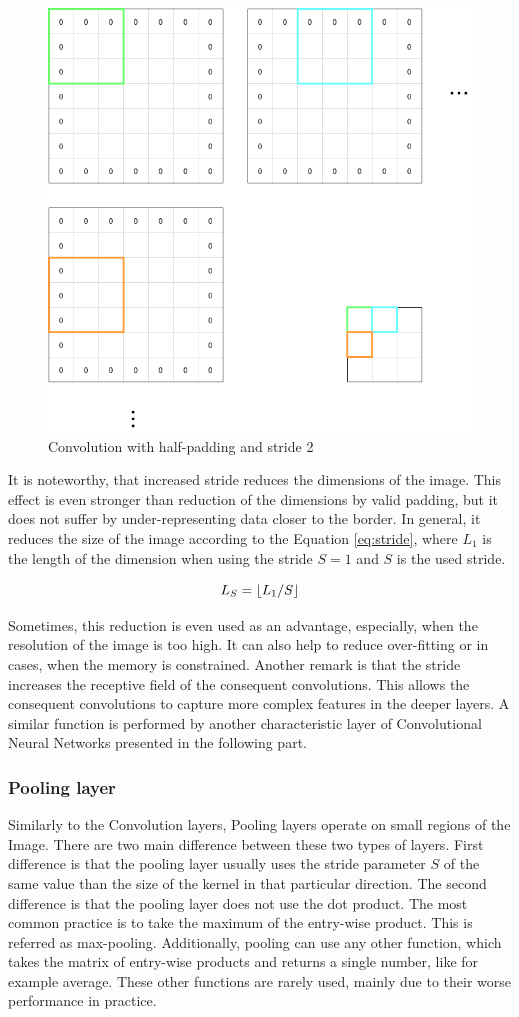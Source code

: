 \begin{figure}
    \centering
    \includegraphics[width=0.6\linewidth]{imgs_andy/stride.png}
    \caption{Convolution with half-padding and stride 2}
    \label{fig:stride}
\end{figure}

It is noteworthy, that increased stride reduces the dimensions of the image.
This effect is even stronger than reduction of the dimensions by valid padding, but it does not suffer by under-representing data closer to the border.
In general, it reduces the size of the image according to the Equation \ref{eq:stride}, where $L_1$ is the length of the dimension when using the stride $S=1$ and $S$ is the used stride.

\begin{equation}
    L_S = \floor*{L_1 / S}
    \label{eq:stride}
\end{equation}

Sometimes, this reduction is even used as an advantage, especially, when the resolution of the image is too high.
It can also help to reduce over-fitting or in cases, when the memory is constrained.
Another remark is that the stride increases the receptive field of the consequent convolutions.
This allows the consequent convolutions to capture more complex features in the deeper layers.
A similar function is performed by another characteristic layer of Convolutional Neural Networks presented in the following part.

\subsubsection{Pooling layer}
Similarly to the Convolution layers, Pooling layers operate on small regions of the Image.
There are two main difference between these two types of layers.
First difference is that the pooling layer usually uses the stride parameter $S$ of the same value than the size of the kernel in that particular direction.
The second difference is that the pooling layer does not use the dot product.
The most common practice is to take the maximum of the entry-wise product.
This is referred as max-pooling.
Additionally, pooling can use any other function, which takes the matrix of entry-wise products and returns a single number, like for example average.
These other functions are rarely used, mainly due to their worse performance in practice. 

